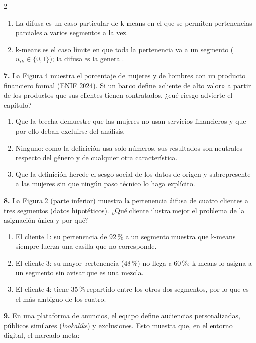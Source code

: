 \documentclass[10pt,letterpaper]{article}
\begin{document}
\begin{multicols}{2}
\begin{enumerate}[label=\alph*),leftmargin=1.1em,itemsep=0pt,topsep=1pt,parsep=0pt,partopsep=0pt]
\item La difusa es un caso particular de k-means en el que se permiten pertenencias parciales a varios segmentos a la vez.
\item k-means es el caso límite en que toda la pertenencia va a un segmento ($u_{ik}\in\{0,1\}$); la difusa es la general.
\end{enumerate}
\vspace{2pt}
\noindent\textbf{7.} La Figura 4 muestra el porcentaje de mujeres y de hombres con un producto financiero formal (ENIF 2024). Si un banco define «cliente de alto valor» a partir de los productos que sus clientes tienen contratados, ¿qué riesgo advierte el capítulo?
\vspace{-3pt}
\begin{enumerate}[label=\alph*),leftmargin=1.1em,itemsep=0pt,topsep=1pt,parsep=0pt,partopsep=0pt]
\item Que la brecha demuestre que las mujeres no usan servicios financieros y que por ello deban excluirse del análisis.
\item Ninguno: como la definición usa solo números, sus resultados son neutrales respecto del género y de cualquier otra característica.
\item Que la definición herede el sesgo social de los datos de origen y subrepresente a las mujeres sin que ningún paso técnico lo haga explícito.
\end{enumerate}
\vspace{2pt}
\noindent\textbf{8.} La Figura 2 (parte inferior) muestra la pertenencia difusa de cuatro clientes a tres segmentos (datos hipotéticos). ¿Qué cliente ilustra mejor el problema de la asignación única y por qué?
\vspace{-3pt}
\begin{enumerate}[label=\alph*),leftmargin=1.1em,itemsep=0pt,topsep=1pt,parsep=0pt,partopsep=0pt]
\item El cliente 1: su pertenencia de 92\,\% a un segmento muestra que k-means siempre fuerza una casilla que no corresponde.
\item El cliente 3: su mayor pertenencia (48\,\%) no llega a 60\,\%; k-means lo asigna a un segmento sin avisar que es una mezcla.
\item El cliente 4: tiene 35\,\% repartido entre los otros dos segmentos, por lo que es el más ambiguo de los cuatro.
\end{enumerate}
\vspace{2pt}
\noindent\textbf{9.} En una plataforma de anuncios, el equipo define audiencias personalizadas, públicos similares (\textit{lookalike}) y exclusiones. Esto muestra que, en el entorno digital, el mercado meta:

\end{multicols}
\end{document}
